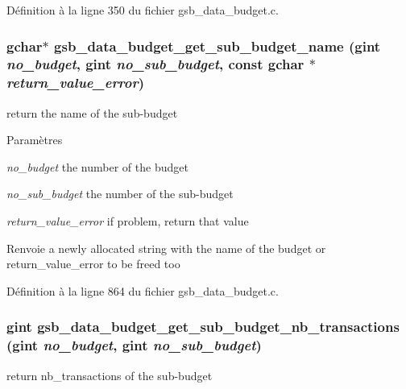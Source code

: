 Définition à la ligne 350 du fichier gsb\_\-data\_\-budget.c.

\subsubsection[{gsb\_\-data\_\-budget\_\-get\_\-sub\_\-budget\_\-name}]{\setlength{\rightskip}{0pt plus 5cm}gchar$\ast$ gsb\_\-data\_\-budget\_\-get\_\-sub\_\-budget\_\-name (gint {\em no\_\-budget}, \/  gint {\em no\_\-sub\_\-budget}, \/  const gchar $\ast$ {\em return\_\-value\_\-error})}\label{gsb__data__budget_8c_a10e64049e14c7fba1d4281d418f34eab}
return the name of the sub-\/budget


\begin{DoxyParams}{Paramètres}
\item[{\em no\_\-budget}]the number of the budget \item[{\em no\_\-sub\_\-budget}]the number of the sub-\/budget \item[{\em return\_\-value\_\-error}]if problem, return that value\end{DoxyParams}
\begin{DoxyReturn}{Renvoie}
a newly allocated string with the name of the budget or return\_\-value\_\-error to be freed too 
\end{DoxyReturn}


Définition à la ligne 864 du fichier gsb\_\-data\_\-budget.c.

\subsubsection[{gsb\_\-data\_\-budget\_\-get\_\-sub\_\-budget\_\-nb\_\-transactions}]{\setlength{\rightskip}{0pt plus 5cm}gint gsb\_\-data\_\-budget\_\-get\_\-sub\_\-budget\_\-nb\_\-transactions (gint {\em no\_\-budget}, \/  gint {\em no\_\-sub\_\-budget})}\label{gsb__data__budget_8c_a4883bd0bfff37d0f4b520ed4dc0b69b4}
return nb\_\-transactions of the sub-\/budget


